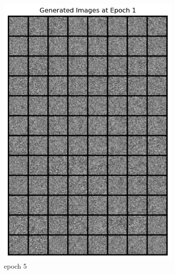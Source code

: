 \documentclass[a4paper]{article}
\theoremstyle{definition}
\newenvironment{soln}{
	\leavevmode\color{blue}\ignorespaces
}{}
\begin{document}
\begin{enumerate} [label=(\alph*)]
\begin{soln}
			\begin{figure}[H]
				\centering
				\begin{subfigure}[b]{0.3\textwidth}
					\centering
					\includegraphics[width=\textwidth]{2-Epoch1.png}
					\caption{epoch 5}
				\end{subfigure}
				\hfill
				\begin{subfigure}[b]{0.3\textwidth}
					\centering

\end{subfigure}
\end{figure}
\end{soln}
\end{enumerate}
\end{document}
